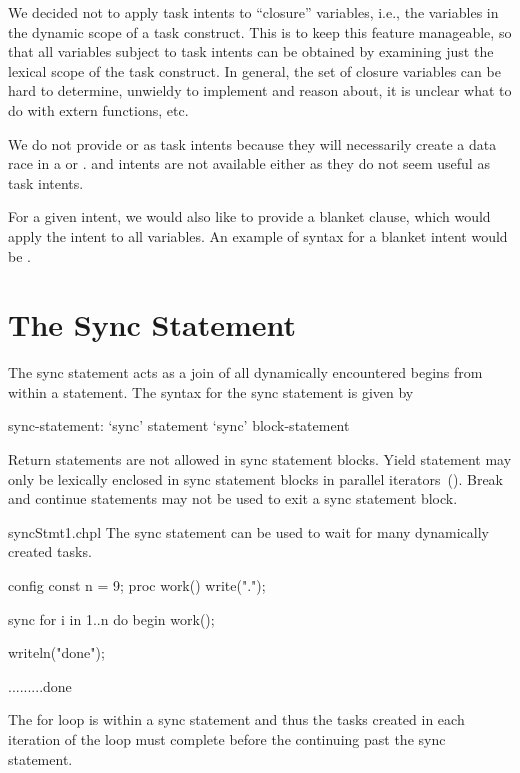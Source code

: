 \begin{rationale}
We decided not to apply task intents to ``closure'' variables, i.e.,
the variables in the dynamic scope of a task construct. This is to
keep this feature manageable, so that all variables subject to task
intents can be obtained by examining just the lexical scope of the
task construct. In general, the set of closure variables can be hard
to determine, unwieldy to implement and reason about, it is unclear
what to do with extern functions, etc.

We do not provide  or  as task intents because they
will necessarily create a data race in a  or .
 and  intents are not available either
as they do not seem useful as task intents.
\end{rationale}

\begin{future}
For a given intent, we would also like to provide a blanket clause,
which would apply the intent to all variables.
An example of syntax for a blanket  intent would be .
\end{future}


\section{The Sync Statement}
\label{Sync_Statement}

The sync statement acts as a join of all dynamically encountered
begins from within a statement.  The syntax for the sync statement is
given by
\begin{syntax}
sync-statement:
  `sync' statement
  `sync' block-statement
\end{syntax}

Return statements are not allowed in sync statement blocks.  Yield
statement may only be lexically enclosed in sync statement blocks in
parallel iterators~().  Break and continue
statements may not be used to exit a sync statement block.

\begin{chapelexample}{syncStmt1.chpl}
The sync statement can be used to wait for many dynamically created
tasks.
\begin{chapelpre}
config const n = 9;
proc work() {
  write(".");
}
\end{chapelpre}
\begin{chapel}
sync for i in 1..n do begin work();
\end{chapel}
\begin{chapelpost}
writeln("done");
\end{chapelpost}
\begin{chapeloutput}
.........done
\end{chapeloutput}
The for loop is within a sync statement and thus the tasks created
in each iteration of the loop must complete before the continuing past
the sync statement.
\end{chapelexample}

